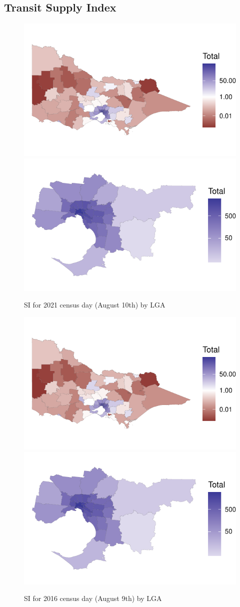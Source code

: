 \documentclass[]{tufte-book}
\begin{document}
\hypertarget{transit-supply-index}{%
\subsection{Transit Supply Index}\label{transit-supply-index}}

\begin{figure}
\includegraphics[width=0.5\linewidth]{Reynolds_Currie_2024_transit_supply_index_GTFS_files/figure-latex/Victoria_SI_2021-1} \includegraphics[width=0.5\linewidth]{Reynolds_Currie_2024_transit_supply_index_GTFS_files/figure-latex/Victoria_SI_2021-2} \caption[SI for 2021 census day (August 10th) by LGA]{SI for 2021 census day (August 10th) by LGA}\label{fig:Victoria_SI_2021}
\end{figure}

\begin{figure}
\includegraphics[width=0.5\linewidth]{Reynolds_Currie_2024_transit_supply_index_GTFS_files/figure-latex/Victoria_SI_2016-1} \includegraphics[width=0.5\linewidth]{Reynolds_Currie_2024_transit_supply_index_GTFS_files/figure-latex/Victoria_SI_2016-2} \caption[SI for 2016 census day (August 9th) by LGA]{SI for 2016 census day (August 9th) by LGA}\label{fig:Victoria_SI_2016}
\end{figure}
\end{document}
